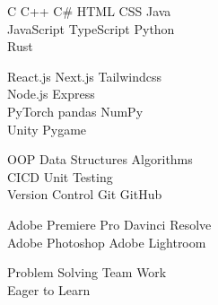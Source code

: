 \documentclass[]{main}
\begin{document}
\begin{minipage}[t]{0.33\textwidth}
C \textbullet{}   C++ \textbullet{} C\# \textbullet{} HTML \textbullet{} CSS \textbullet{} Java \\
JavaScript \textbullet{} TypeScript \textbullet{} Python \\
Rust
\sectionsep

React.js \textbullet{} Next.js \textbullet{} Tailwindcss \\
Node.js \textbullet{} Express \\
PyTorch \textbullet{} pandas \textbullet{} NumPy \\
Unity \textbullet{} Pygame
\sectionsep

OOP \textbullet{} Data Structures \textbullet{} Algorithms \\ CI\/CD \textbullet{} Unit Testing 
 \\ Version Control \textbullet{} Git \textbullet{} GitHub
 
 \sectionsep
 
 Adobe Premiere Pro \textbullet{} Davinci Resolve 
\\ Adobe Photoshop \textbullet{} Adobe Lightroom

\sectionsep

Problem Solving  \textbullet{} Team Work \\
Eager to Learn \\
\sectionsep

%
%

\end{minipage} 
\hfill
\end{document}

